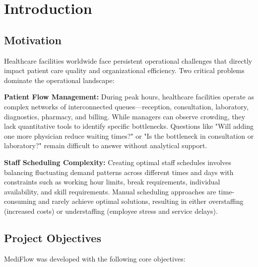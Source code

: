\documentclass[12pt,a4paper]{article}
\begin{document}
\section{Introduction}
\label{sec:introduction}

\subsection{Motivation}
\label{subsec:motivation}

Healthcare facilities worldwide face persistent operational challenges that directly impact patient care quality and organizational efficiency. Two critical problems dominate the operational landscape:

\vspace{0.5em}
\noindent\textbf{Patient Flow Management:} During peak hours, healthcare facilities operate as complex networks of interconnected queues—reception, consultation, laboratory, diagnostics, pharmacy, and billing. While managers can observe crowding, they lack quantitative tools to identify specific bottlenecks. Questions like "Will adding one more physician reduce waiting times?" or "Is the bottleneck in consultation or laboratory?" remain difficult to answer without analytical support.

\vspace{0.5em}
\noindent\textbf{Staff Scheduling Complexity:} Creating optimal staff schedules involves balancing fluctuating demand patterns across different times and days with constraints such as working hour limits, break requirements, individual availability, and skill requirements. Manual scheduling approaches are time-consuming and rarely achieve optimal solutions, resulting in either overstaffing (increased costs) or understaffing (employee stress and service delays).

\subsection{Project Objectives}
\label{subsec:objectives}

MediFlow was developed with the following core objectives:
\end{document}
